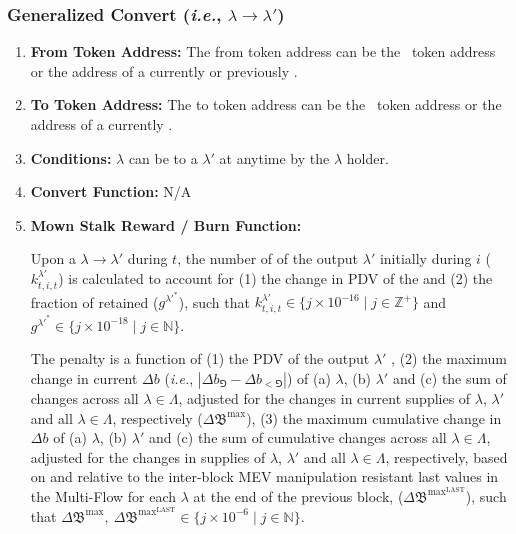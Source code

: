 \documentclass[class=article, crop=false]{standalone}
\begin{document}

\subsubsection{Generalized Convert (\textit{i.e.}, $\lambda \rightarrow \lambda'$)}

\begin{enumerate}
    \item \textbf{From Token Address:} The from token address can be the \Pinto\ token address or the address of a currently or previously  .
    
    \item \textbf{To Token Address:} The to token address can be the \Pinto\ token address or the address of a currently  .
    
    \item \textbf{Conditions:}  $\lambda$ can be  to a $\lambda'$  at anytime by the $\lambda$  holder.
    
    \item \textbf{Convert Function:} N/A

    \item \textbf{Mown Stalk Reward / Burn Function:} 

    Upon a $\lambda \rightarrow \lambda'$  during $t$, the number of  of the output $\lambda'$  initially  during $i$ ($k_{t,i,t}^{\lambda'}$) is calculated to account for (1) the change in PDV of the  and (2) the fraction of  retained ($g^{\lambda'^{*}}$), such that $k_{t,i,t}^{\lambda'} \in \{j \times 10^{-16} \mid j \in \mathbb{Z}^{+} \}$ and $g^{\lambda'^{*}} \in \{j \times 10^{-18} \mid j \in \mathbb{N} \}$.
    
    The  penalty is a function of 
    (1) the PDV of the output $\lambda'$ , 
    (2) the maximum change in current $\Delta b$ (\textit{i.e.}, $|\Delta b_{\Game} - \Delta b_{<\Game}|$) of (a) $\lambda$, (b) $\lambda'$ and (c) the sum of changes across all $\lambda \in \Lambda$, adjusted for the changes in current supplies of $\lambda$, $\lambda'$ and all $\lambda \in \Lambda$, respectively ($\Delta \mathfrak{B}^\text{max}$), 
    (3) the maximum cumulative change in $\Delta b$ of (a) $\lambda$, (b) $\lambda'$ and (c) the sum of cumulative changes across all $\lambda \in \Lambda$, adjusted for the changes in supplies of $\lambda$, $\lambda'$ and all $\lambda \in \Lambda$, respectively, based on and relative to the inter-block MEV manipulation resistant last values in the Multi-Flow  for each $\lambda$ at the end of the previous block, ($\Delta \mathfrak{B}^{\text{max}^{\text{LAST}}}$), such that $\Delta \mathfrak{B}^\text{max},\ \Delta \mathfrak{B}^{\text{max}^{\text{LAST}}} \in \{j \times 10^{-6} \mid j \in \mathbb{N} \}$.


\end{enumerate}
\end{document}
